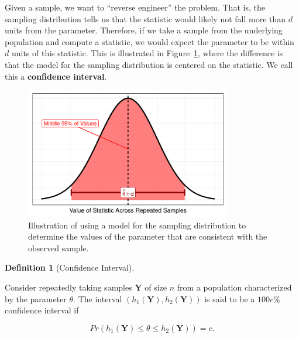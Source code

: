 \documentclass[
  letterpaper,
  DIV=11,
  numbers=noendperiod]{scrreprt}
\theoremstyle{definition}
\newtheorem{definition}{Definition}[chapter]
\theoremstyle{definition}
\theoremstyle{plain}
\theoremstyle{remark}
\begin{document}
Given a sample, we want to ``reverse engineer'' the problem. That is,
the sampling distribution tells us that the statistic would likely not
fall more than \(d\) units from the parameter. Therefore, if we take a
sample from the underlying population and compute a statistic, we would
expect the parameter to be within \(d\) units of this statistic. This is
illustrated in Figure~\ref{fig-inference-model}, where the difference is
that the model for the sampling distribution is centered on the
statistic. We call this a \textbf{confidence interval}.

\begin{figure}

{\centering \includegraphics[width=0.8\textwidth,height=\textheight]{./images/fig-inference-model-1.pdf}

}

\caption{\label{fig-inference-model}Illustration of using a model for
the sampling distribution to determine the values of the parameter that
are consistent with the observed sample.}

\end{figure}

\begin{definition}[Confidence
Interval]\protect\hypertarget{def-confidence-interval}{}\label{def-confidence-interval}

Consider repeatedly taking samples \(\mathbf{Y}\) of size \(n\) from a
population characterized by the parameter \(\theta\). The interval
\(\left(h_1(\mathbf{Y}), h_2(\mathbf{Y})\right)\) is said to be a
\(100c\)\% confidence interval if

\[Pr\left(h_1(\mathbf{Y}) \leq \theta \leq h_2(\mathbf{Y})\right) = c.\]

\end{definition}
\end{document}
